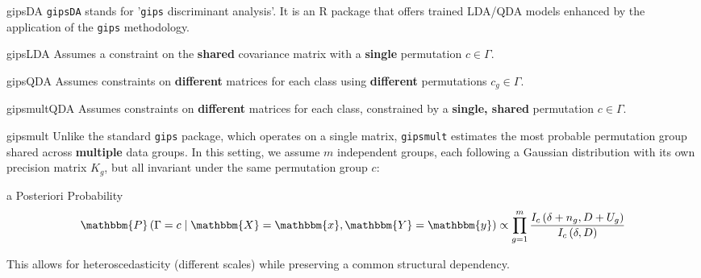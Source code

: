 \documentclass[aspectratio=169,xcolor=dvipsnames]{beamer}
\begin{document}
\begin{frame}{gipsDA}
    \texttt{gipsDA} stands for '\texttt{gips} discriminant analysis'. It is an R package that offers trained LDA/QDA models enhanced by the application of the \texttt{gips} methodology.

    \begin{block}{gipsLDA}
        Assumes a constraint on the \textbf{shared} covariance matrix with a \textbf{single} permutation $c \in \Gamma$.
    \end{block}
    \begin{block}{gipsQDA}
        Assumes constraints on \textbf{different} matrices for each class using \textbf{different} permutations $c_g \in \Gamma$.
    \end{block}
    \begin{block}{gipsmultQDA}
        Assumes constraints on \textbf{different} matrices for each class, constrained by a \textbf{single, shared} permutation $c \in \Gamma$.
    \end{block}
\end{frame}

\begin{frame}{gipsmult}
    Unlike the standard \texttt{gips} package, which operates on a single matrix, \texttt{gipsmult} estimates the most probable permutation group shared across \textbf{multiple} data groups. 
    \newline \newline
    In this setting, we assume $m$ independent groups, each following a Gaussian distribution with its own precision matrix $K_g$, but all invariant under the same permutation group $c$:
    \begin{block}{a Posteriori Probability}
        \begin{equation*}
                \mathbbm{P}\left(\Gamma = c \mid \mathbbm{X} = \mathbbm{x}, \mathbbm{Y} = \mathbbm{y}\right) \propto \prod_{g=1}^m \frac{I_c\left(\delta + n_g, D+U_g\right)}{I_c\left(\delta, D\right)}
        \end{equation*}
    \end{block}
    This allows for heteroscedasticity (different scales) while preserving a common structural dependency.
\end{frame}

\end{document}
